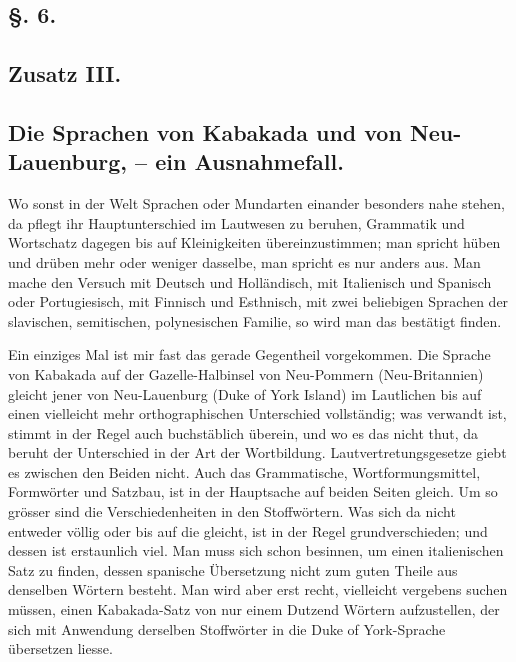 \subsection*{§. 6.}\label{III.I.I.6}
\subsection*{Zusatz III.}
\subsection*{Die Sprachen von Kabakada und von Neu-Lauenburg, – ein Ausnahmefall.}
Wo sonst in der Welt Sprachen oder Mundarten einander besonders nahe stehen, da pflegt ihr Hauptunterschied im Lautwesen zu beruhen, Grammatik und Wortschatz dagegen bis auf Kleinigkeiten übereinzu\label{fp.176}stimmen; man spricht hüben und drüben mehr oder weniger dasselbe, man spricht es nur anders aus. Man mache den Versuch mit Deutsch und Holländisch, mit Italienisch und Spanisch oder Portugiesisch, mit Finnisch und Esthnisch, mit zwei beliebigen Sprachen der slavischen, semitischen, polynesischen Familie, so wird man das bestätigt finden.

Ein einziges Mal ist mir fast das gerade Gegentheil vorgekommen. Die Sprache von Kabakada auf der Gazelle-Halbinsel von Neu-Pommern (Neu-Britannien) gleicht jener von Neu-Lauenburg (Duke of York Island) im Lautlichen bis auf einen vielleicht mehr orthographischen Unterschied vollständig; was verwandt ist, stimmt in der Regel auch buchstäblich überein, und wo es das nicht thut, da beruht der Unterschied in der Art der Wortbildung. Lautvertretungsgesetze giebt es zwischen den Beiden nicht. Auch das Grammatische, Wortformungsmittel, Formwörter und Satzbau, ist in der Hauptsache auf beiden Seiten gleich. Um so grösser sind die Verschiedenheiten in den Stoffwörtern. Was sich da nicht entweder völlig oder bis auf die  gleicht, ist in der Regel grundverschieden; und dessen ist erstaunlich viel. Man muss sich schon besinnen, um einen italienischen Satz zu finden, dessen spanische Übersetzung nicht zum guten Theile aus denselben Wörtern besteht. Man wird aber erst recht,  vielleicht vergebens suchen müssen, einen Kabakada-Satz von nur einem Dutzend Wörtern aufzustellen, der sich mit Anwendung derselben Stoffwörter in die Duke of York-Sprache übersetzen liesse.

